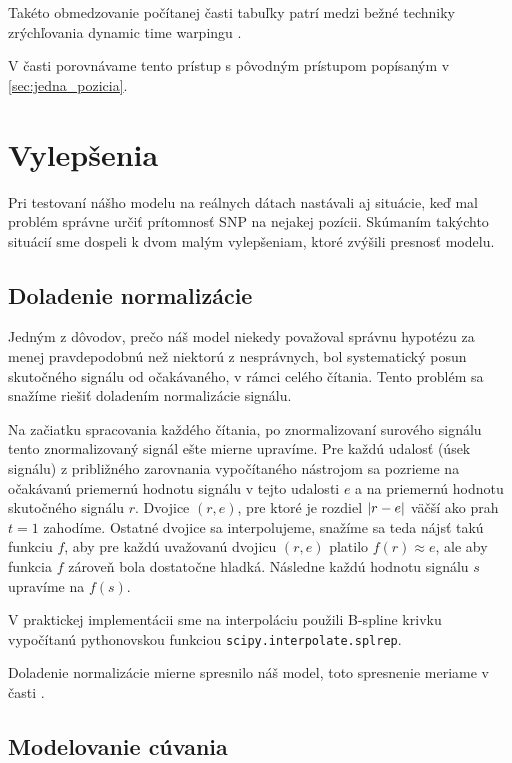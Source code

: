 Takéto obmedzovanie počítanej časti tabuľky patrí medzi bežné techniky zrýchľovania
dynamic time warpingu \cite{FastDTW}.

V časti  porovnávame tento prístup s pôvodným prístupom popísaným v \ref{sec:jedna_pozicia}.


\section{Vylepšenia}
\label{sec:vylepsenia}
Pri testovaní nášho modelu na reálnych dátach nastávali aj situácie, keď mal problém správne určiť 
prítomnosť SNP na nejakej pozícii. Skúmaním takýchto situácií sme dospeli k dvom malým vylepšeniam,
ktoré zvýšili presnosť modelu.

\subsection{Doladenie normalizácie}
\label{upg:tweaking}
Jedným z dôvodov, prečo náš model niekedy považoval správnu hypotézu za menej pravdepodobnú než
niektorú z nesprávnych, bol systematický posun skutočného signálu od očakávaného, v rámci celého
čítania. Tento problém sa snažíme riešiť doladením normalizácie signálu.

Na začiatku spracovania každého čítania, po znormalizovaní surového signálu
 tento znormalizovaný signál ešte mierne upravíme.
Pre každú udalosť (úsek signálu) z približného zarovnania vypočítaného nástrojom \resquiggle{} sa
pozrieme na očakávanú priemernú hodnotu signálu v tejto udalosti $e$ a na priemernú hodnotu skutočného
signálu $r$. Dvojice $(r, e)$, pre ktoré je rozdiel $\abs*{r-e}$ väčší ako prah $t=1$ zahodíme.
Ostatné dvojice sa interpolujeme, snažíme sa teda nájsť takú funkciu $f$, aby pre každú uvažovanú
dvojicu $(r, e)$ platilo $f(r) \approx e$, ale aby funkcia $f$ zároveň bola dostatočne hladká.
Následne každú hodnotu signálu $s$ upravíme na $f(s)$.


V praktickej implementácii sme na interpoláciu použili B-spline krivku vypočítanú pythonovskou
funkciou \texttt{scipy.interpolate.splrep}.

Doladenie normalizácie mierne spresnilo náš model, toto spresnenie meriame v časti .

\subsection{Modelovanie cúvania}
\label{upg:flashbacks}

